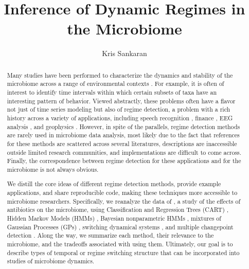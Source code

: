 \documentclass[14pt]{extreport}
\title{Inference of Dynamic Regimes in the Microbiome}
\author{Kris Sankaran}
\begin{document}
\maketitle

\begin{abstract}
Many studies have been performed to characterize the dynamics and stability of
the microbiome across a range of environmental contexts
\citep{costello2012application, stein2013ecological, faust2015metagenomics}. For
example, it is often of interest to identify time intervals within which certain
subsets of taxa have an interesting pattern of behavior. Viewed abstractly,
these problems often have a flavor not just of time series modeling but also of
regime detection, a problem with a rich history across a variety of
applications, including speech recognition \citep{fox2011sticky}, finance
\citep{lee2009optimal}, EEG analysis \citep{camilleri2014automatic}, and
geophysics \citep{weatherley2002relationship}. However, in spite of the
parallels, regime detection methods are rarely used in microbiome data analysis,
most likely due to the fact that references for these methods are scattered
across several literatures, descriptions are inaccessible outside limited
research communities, and implementations are difficult to come across. Finally,
the correspondence between regime detection for these applications and for the
microbiome is not always obvious.

We distill the core ideas of different regime detection methods, provide example
applications, and share reproducible code, making these techniques more
accessible to microbiome researchers. Specifically, we reanalyze the data of
\cite{dethlefsen2011incomplete}, a study of the effects of antibiotics on the
microbiome, using Classification and Regression Trees (CART)
\citep{breiman1984classification}, Hidden Markov Models (HMMs)
\citep{rabiner1986introduction}, Bayesian nonparametric HMMs
\citep{teh2010hierarchical, fox2008hdp}, mixtures of Gaussian Processes (GPs)
\citep{rasmussen2002infinite}, switching dynamical systems
\citep{linderman2016recurrent}, and multiple changepoint detection
\citep{fan2015empirical}. Along the way, we summarize each method, their
relevance to the microbiome, and the tradeoffs associated with using them.
Ultimately, our goal is to describe types of temporal or regime switching
structure that can be incorporated into studies of microbiome dynamics.
\end{abstract}
\end{document}
